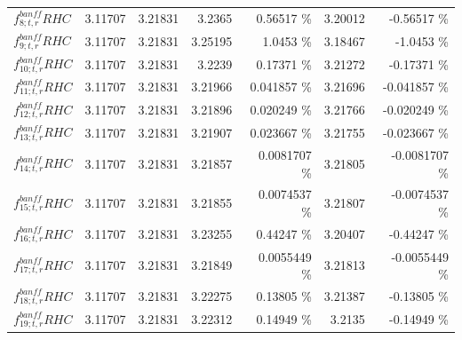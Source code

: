 \begin{table}
\begin{tabular}{| l | r | r | r  r | r  r |}
                                                       $f_{8; t, r}^{banff} RHC$ &         3.11707 & 3.21831 & 3.2365 &         0.56517 \%  &         3.20012 &        -0.56517 \%  \\ 
                                                       $f_{9; t, r}^{banff} RHC$ &         3.11707 & 3.21831 & 3.25195 &          1.0453 \%  &         3.18467 &         -1.0453 \%  \\ 
                                                      $f_{10; t, r}^{banff} RHC$ &         3.11707 & 3.21831 & 3.2239 &         0.17371 \%  &         3.21272 &        -0.17371 \%  \\ 
                                                      $f_{11; t, r}^{banff} RHC$ &         3.11707 & 3.21831 & 3.21966 &        0.041857 \%  &         3.21696 &       -0.041857 \%  \\ 
                                                      $f_{12; t, r}^{banff} RHC$ &         3.11707 & 3.21831 & 3.21896 &        0.020249 \%  &         3.21766 &       -0.020249 \%  \\ 
                                                      $f_{13; t, r}^{banff} RHC$ &         3.11707 & 3.21831 & 3.21907 &        0.023667 \%  &         3.21755 &       -0.023667 \%  \\ 
                                                      $f_{14; t, r}^{banff} RHC$ &         3.11707 & 3.21831 & 3.21857 &       0.0081707 \%  &         3.21805 &      -0.0081707 \%  \\ 
                                                      $f_{15; t, r}^{banff} RHC$ &         3.11707 & 3.21831 & 3.21855 &       0.0074537 \%  &         3.21807 &      -0.0074537 \%  \\ 
                                                      $f_{16; t, r}^{banff} RHC$ &         3.11707 & 3.21831 & 3.23255 &         0.44247 \%  &         3.20407 &        -0.44247 \%  \\ 
                                                      $f_{17; t, r}^{banff} RHC$ &         3.11707 & 3.21831 & 3.21849 &       0.0055449 \%  &         3.21813 &      -0.0055449 \%  \\ 
                                                      $f_{18; t, r}^{banff} RHC$ &         3.11707 & 3.21831 & 3.22275 &         0.13805 \%  &         3.21387 &        -0.13805 \%  \\ 
                                                      $f_{19; t, r}^{banff} RHC$ &         3.11707 & 3.21831 & 3.22312 &         0.14949 \%  &          3.2135 &        -0.14949 \%  \\ 

\end{tabular}
\end{table}
